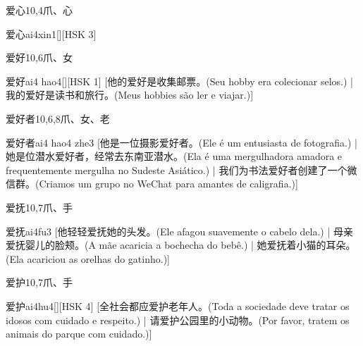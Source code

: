 \begin{entry}{爱心}{10,4}{⽖、⼼}
  \begin{phonetics}{爱心}{ai4xin1}[][HSK 3]
  \end{phonetics}
\end{entry}

\begin{entry}{爱好}{10,6}{⽖、⼥}
  \begin{phonetics}{爱好}{ai4 hao4}[][HSK 1]
    [他的爱好是收集邮票。(Seu hobby era colecionar selos.)  | 我的爱好是读书和旅行。(Meus hobbies são ler e viajar.)]
  \end{phonetics}
\end{entry}

\begin{entry}{爱好者}{10,6,8}{⽖、⼥、⽼}
  \begin{phonetics}{爱好者}{ai4 hao4 zhe3}
    [他是一位摄影爱好者。(Ele é um entusiasta de fotografia.) | 她是位潜水爱好者，经常去东南亚潜水。(Ela é uma mergulhadora amadora e frequentemente mergulha no Sudeste Asiático.)  | 我们为书法爱好者创建了一个微信群。(Criamos um grupo no WeChat para amantes de caligrafia.)]
  \end{phonetics}
\end{entry}

\begin{entry}{爱抚}{10,7}{⽖、⼿}
  \begin{phonetics}{爱抚}{ai4fu3}
    [他轻轻爱抚她的头发。(Ele afagou suavemente o cabelo dela.) | 母亲爱抚婴儿的脸颊。(A mãe acaricia a bochecha do bebê.) | 她爱抚着小猫的耳朵。(Ela acariciou as orelhas do gatinho.)]
  \end{phonetics}
\end{entry}

\begin{entry}{爱护}{10,7}{⽖、⼿}
  \begin{phonetics}{爱护}{ai4hu4}[][HSK 4]
    [全社会都应爱护老年人。(Toda a sociedade deve tratar os idosos com cuidado e respeito.) | 请爱护公园里的小动物。(Por favor, tratem os animais do parque com cuidado.)]
  \end{phonetics}
\end{entry}

